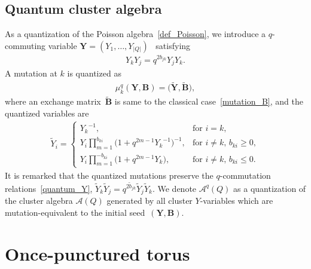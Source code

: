 \documentclass[pdftex]{sigma}
\numberwithin{equation}{section}
\begin{document}
\subsection{Quantum cluster algebra}
As a quantization of the Poisson algebra~\eqref{def_Poisson}, we introduce a $q$-commuting variable $\boldsymbol{Y}=(Y_1, \dots, Y_{|Q|})$~\cite{FockGonc09b, FockGonc09a} satisfying
\begin{gather} \label{quantum_Y}
 Y_k Y_j = q^{2 b_{jk}} Y_j Y_k .
\end{gather}
A mutation at $k$ is quantized as
\begin{gather*}
 \mu^q_k ( \boldsymbol{Y}, \mathbf{B}) = \big( \widetilde{\boldsymbol{Y}}, \widetilde{ \mathbf{B} }\big) ,
\end{gather*}
where
an exchange matrix~$\widetilde{\mathbf{B}}$ is same to the classical case~\eqref{mutation_B}, and the quantized variables are
\begin{gather*}
 \widetilde{Y}_i= \begin{cases}
 {Y_k}^{-1} , & \text{for $i=k$}, \\
 \displaystyle Y_i \prod_{m=1}^{b_{ki}} \big( 1+ q^{2m-1} {Y_k}^{-1} \big)^{-1} , & \text{for $i\neq k$, $b_{ki} \geq 0$}, \\
 \displaystyle Y_i \prod_{m=1}^{-b_{ki}} \big( 1 + q^{2m-1} Y_k \big) , & \text{for $i \neq k$, $b_{ki} \leq 0$}.
 \end{cases}
\end{gather*}
It is remarked that the quantized mutations preserve the $q$-commutation relations~\eqref{quantum_Y}, $\widetilde{Y}_k \widetilde{Y}_j=q^{2 \widetilde{b}_{jk}} \widetilde{Y}_j \widetilde{Y}_k$. We denote $\mathcal{A}^q(Q)$ as a quantization of the cluster algebra $\mathcal{A}(Q)$ generated by all cluster $Y$-variables which are mutation-equivalent to the initial seed~$(\boldsymbol{Y}, \mathbf{B})$.

\section{Once-punctured torus}\label{sec:torus}
\end{document}
